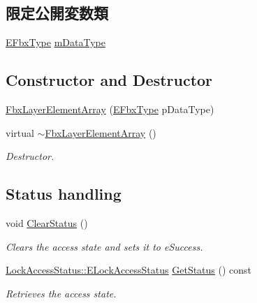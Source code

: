 \subsection*{限定公開変数類}
\begin{DoxyCompactItemize}
\item 
\hyperlink{fbxpropertytypes_8h_a73913a5ddfb20e57c6f25e9e6784bd92}{E\+Fbx\+Type} \hyperlink{class_fbx_layer_element_array_a47930d23e0f3e596bee667ffe900268b}{m\+Data\+Type}
\end{DoxyCompactItemize}
\subsection*{Constructor and Destructor}
\begin{DoxyCompactItemize}
\item 
\hyperlink{class_fbx_layer_element_array_a99815649c1cf07a8d1446a0e086e3871}{Fbx\+Layer\+Element\+Array} (\hyperlink{fbxpropertytypes_8h_a73913a5ddfb20e57c6f25e9e6784bd92}{E\+Fbx\+Type} p\+Data\+Type)
\item 
virtual \hyperlink{class_fbx_layer_element_array_abee3841f66f7d668f113c728a93dd26d}{$\sim$\+Fbx\+Layer\+Element\+Array} ()
\begin{DoxyCompactList}\small\item\em Destructor. \end{DoxyCompactList}\end{DoxyCompactItemize}
\subsection*{Status handling}
\begin{DoxyCompactItemize}
\item 
void \hyperlink{class_fbx_layer_element_array_a6873dc740572d69cccb83bdbaf7633b6}{Clear\+Status} ()
\begin{DoxyCompactList}\small\item\em Clears the access state and sets it to e\+Success. \end{DoxyCompactList}\item 
\hyperlink{class_lock_access_status_a3314dad01b38dd90f5393e108a07b3c1}{Lock\+Access\+Status\+::\+E\+Lock\+Access\+Status} \hyperlink{class_fbx_layer_element_array_a5f23239e1ed76a7eab70b031c514167a}{Get\+Status} () const
\begin{DoxyCompactList}\small\item\em Retrieves the access state. \end{DoxyCompactList}\end{DoxyCompactItemize}
